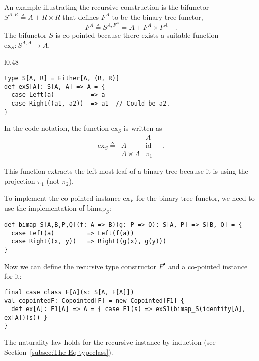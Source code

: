 An example illustrating the recursive construction is the bifunctor
$S^{A,R}\triangleq A+R\times R$ that defines $F^{A}$ to be the binary
tree functor, 
\[
F^{A}\triangleq S^{A,F^{A}}=A+F^{A}\times F^{A}\quad.
\]
The bifunctor $S$ is co-pointed because there exists a suitable function
$\text{ex}_{S}:S^{A,A}\rightarrow A$.

\begin{wrapfigure}{l}{0.48\columnwidth}%
\vspace{0.35\baselineskip}
\begin{lstlisting}
type S[A, R] = Either[A, (R, R)]
def exS[A]: S[A, A] => A = {
  case Left(a)          => a
  case Right((a1, a2))  => a1  // Could be a2.
}
\end{lstlisting}

\vspace{-2.25\baselineskip}
\end{wrapfigure}%

\noindent In the code notation, the function $\text{ex}_{S}$ is written
as\vspace{-0.2\baselineskip}
\[
\text{ex}_{S}\triangleq\,\begin{array}{|c||c|}
 & A\\
\hline A & \text{id}\\
A\times A & \pi_{1}
\end{array}\quad.
\]
\vspace{-0.75\baselineskip}

\noindent This function extracts the left-most leaf of a binary tree
because it is using the projection $\pi_{1}$ (not $\pi_{2}$).

To implement the co-pointed instance $\text{ex}_{F}$ for the binary
tree functor, we need to use the implementation of $\text{bimap}_{S}$:
\begin{lstlisting}
def bimap_S[A,B,P,Q](f: A => B)(g: P => Q): S[A, P] => S[B, Q] = {
  case Left(a)         => Left(f(a))
  case Right((x, y))   => Right((g(x), g(y)))
}
\end{lstlisting}
Now we can define the recursive type constructor $F^{\bullet}$ and
a co-pointed instance for it:
\begin{lstlisting}
final case class F[A](s: S[A, F[A]])
val copointedF: Copointed[F] = new Copointed[F1] {
  def ex[A]: F1[A] => A = { case F1(s) => exS1(bimap_S(identity[A], ex[A])(s)) }
}
\end{lstlisting}

The naturality law holds for the recursive instance by induction (see
Section~\ref{subsec:The-Eq-typeclass}).


